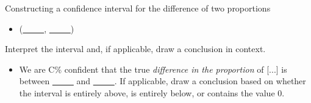 \begin{onebox}{Constructing a confidence interval for the difference of two proportions}
\begin{itemize}
\begin{itemize}
\end{itemize}
\item[] (\underline{\ \ \ \ \ }, \underline{\ \ \ \ \ })
\end{itemize}
   Interpret the interval and, if applicable, draw a conclusion in context.\vspace{-1mm}
\begin{itemize}
\item[] We are C\% confident that the true \emph{difference in the proportion} of [...]  is between \underline{\ \ \ \ \ } and \underline{\ \ \ \ \ }.  If applicable, draw a conclusion based on whether the interval is entirely above, is entirely below, or contains the value 0.  

\end{itemize}\end{onebox}

